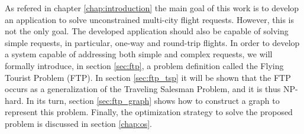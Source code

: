 As refered in chapter \ref{chap:introduction} the main goal of this work is to develop an application to solve unconstrained multi-city flight requests. However, this is not the only goal. The developed application should also be capable of solving simple requests, in particular, one-way and round-trip flights. In order to develop a system capable of addressing both simple and complex requests, we will formally introduce, in section \ref{sec:ftp}, a problem definition called the Flying Tourist Problem (FTP). In section \ref{sec:ftp_tsp} it will be shown that the FTP occurs as a generalization of the Traveling Salesman Problem, and it is thus NP-hard. In its turn, section \ref{sec:ftp_graph} shows how to construct a graph to represent this problem. Finally, the optimization strategy to solve the proposed problem is discussed in section \ref{chap:os}. 